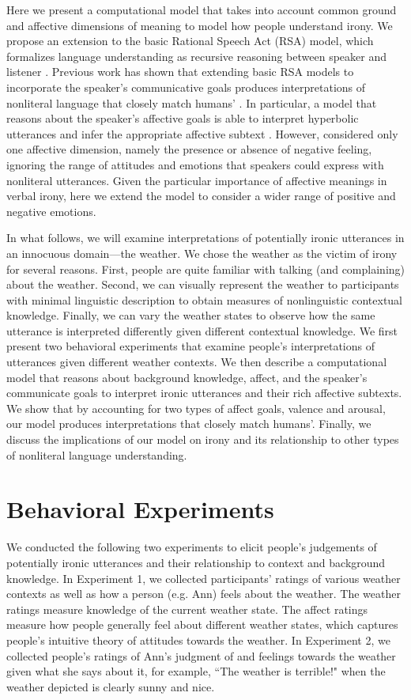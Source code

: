\documentclass[10pt,letterpaper]{article}
\begin{document}
Here we present a computational model that takes into account common ground and affective dimensions of meaning to model how people understand irony. We propose an extension to the basic Rational Speech Act (RSA) model, which formalizes language understanding as recursive reasoning between speaker and listener \cite{frank2012predicting, goodman2013knowledge}. Previous work has shown that extending basic RSA models to incorporate the speaker's communicative goals produces interpretations of nonliteral language that closely match humans' \cite{kao2014nonliteral, kao2014formalizing}. In particular, a model that reasons about the speaker's affective goals is able to interpret hyperbolic utterances and infer the appropriate affective subtext \cite{kao2014nonliteral}. However, \cite{kao2014nonliteral} considered only one affective dimension, namely the presence or absence of negative feeling, ignoring the range of attitudes and emotions that speakers could express with nonliteral utterances. Given the particular importance of affective meanings in verbal irony, here we extend the model to consider a wider range of positive and negative emotions. 

In what follows, we will examine interpretations of potentially ironic utterances in an innocuous domain---the weather. We chose the weather as the victim of irony for several reasons. First, people are quite familiar with talking (and complaining) about the weather. Second, we can visually represent the weather to participants with minimal linguistic description to obtain measures of nonlinguistic contextual knowledge. Finally, we can vary the weather states to observe how the same utterance is interpreted differently given different contextual knowledge. We first  present two behavioral experiments that examine people's interpretations of utterances given different weather contexts. We then describe a computational model that reasons about background knowledge, affect, and the speaker's communicate goals to interpret ironic utterances and their rich affective subtexts. We show that by accounting for two types of affect goals, valence and arousal, our model produces interpretations that closely match humans'. Finally, we discuss the implications of our model on irony and its relationship to other types of nonliteral language understanding.

\section{Behavioral Experiments}
We conducted the following two experiments to elicit people's judgements of potentially ironic utterances and their relationship to context and background knowledge. In Experiment 1, we collected participants' ratings of various weather contexts as well as how a person (e.g. Ann) feels about the weather. The weather ratings measure knowledge of the current weather state. The affect ratings measure how people generally feel about different weather states, which captures people's intuitive theory of attitudes towards the weather. In Experiment 2, we collected people's ratings of Ann's judgment of and feelings towards the weather given what she says about it, for example, ``The weather is terrible!" when the weather depicted is clearly sunny and nice.
\end{document}
